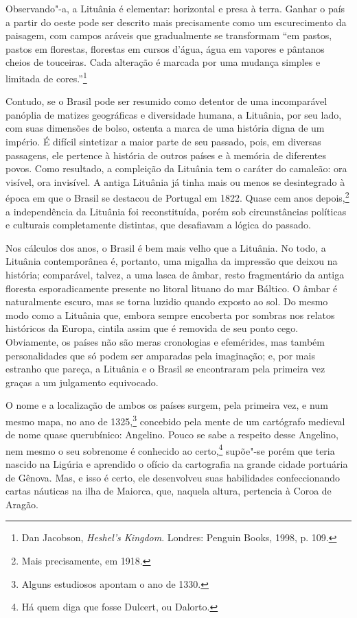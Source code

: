 Observando"-a, a Lituânia é elementar: horizontal e presa à terra.
Ganhar o país a partir do oeste pode ser descrito mais precisamente como
um escurecimento da paisagem, com campos aráveis que gradualmente se
transformam ``em pastos, pastos em florestas, florestas em cursos d'água, 
água em vapores e pântanos cheios de touceiras. Cada alteração é
marcada por uma mudança simples e limitada de cores.''\footnote{Dan Jacobson, \textit{Heshel's Kingdom}. Londres: Penguin Books, 1998, p. 109.}

Contudo, se o Brasil pode ser resumido como detentor de uma incomparável
panóplia de matizes geográficas e diversidade humana, a Lituânia, por
seu lado, com suas dimensões de bolso, ostenta a marca de uma história
digna de um império. É difícil sintetizar a maior parte de seu passado,
pois, em diversas passagens, ele pertence à história de outros
países e à memória de diferentes povos. Como resultado, a compleição da
Lituânia tem o caráter do camaleão: ora visível, ora invisível. A
antiga Lituânia já tinha mais ou menos se desintegrado à época em que o
Brasil se destacou de Portugal em 1822. Quase cem anos depois,\footnote{Mais
precisamente, em 1918.} a independência da Lituânia foi reconstituída,
porém sob circunstâncias políticas e culturais completamente distintas,
que desafiavam a lógica do passado. 

Nos cálculos dos anos, o Brasil é
bem mais velho que a Lituânia. No todo, a Lituânia contemporânea é,
portanto, uma migalha da impressão que deixou na história; comparável,
talvez, a uma lasca de âmbar, resto fragmentário da antiga floresta
esporadicamente presente no litoral lituano do mar Báltico. O âmbar é
naturalmente escuro, mas se torna luzidio quando exposto ao sol. Do
mesmo modo como a Lituânia que, embora sempre encoberta por sombras nos
relatos históricos da Europa, cintila assim que é removida de seu ponto
cego. Obviamente, os países não são meras cronologias e efemérides, mas
também personalidades que só podem ser amparadas pela imaginação; e, por
mais estranho que pareça, a Lituânia e o Brasil se encontraram pela
primeira vez graças a um julgamento equivocado.

O nome e a localização de ambos os países surgem, pela primeira vez, e
num mesmo mapa, no ano de 1325,\footnote{Alguns estudiosos apontam o ano de 1330.}
concebido pela mente de um cartógrafo medieval de nome quase
querubínico: Angelino. Pouco se sabe a respeito desse Angelino, nem
mesmo o seu sobrenome é conhecido ao certo,\footnote{Há quem diga que fosse
Dulcert, ou Dalorto.} supõe"-se porém que teria nascido na Ligúria e
aprendido o ofício da cartografia na grande cidade portuária de Gênova.
Mas, e isso é certo, ele desenvolveu suas habilidades confeccionando
cartas náuticas na ilha de Maiorca, que, naquela altura, pertencia à
Coroa de Aragão. 

